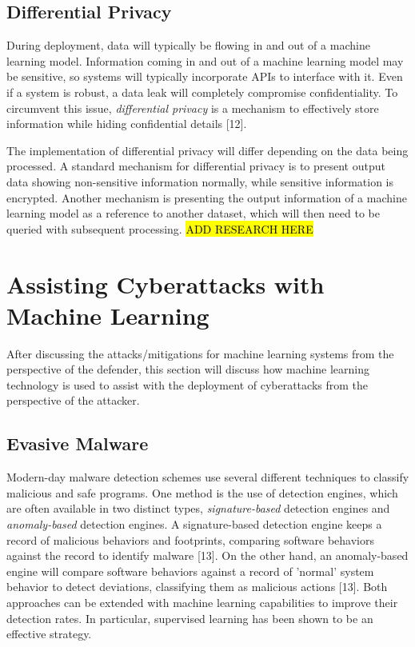 \documentclass[11pt,conference]{IEEEtran}
\begin{document}
\subsection{Differential Privacy}
During deployment, data will typically be flowing in and out of a machine
learning model. Information coming in and out of a machine learning model may be sensitive, so
systems will typically incorporate APIs to interface with it. Even if a system
is robust, a data leak will completely compromise confidentiality. To
circumvent this issue, \emph{differential privacy} is a mechanism to
effectively store
information while hiding confidential details [12].

The implementation of differential privacy will differ depending on the data
being processed. A standard mechanism for differential privacy is to present
output data showing non-sensitive information normally, while sensitive
information is encrypted. Another mechanism is presenting the output
information of a machine learning model as a reference to another dataset, which
will then need to be queried with subsequent processing.
\hl{ADD RESEARCH HERE}

\section{Assisting Cyberattacks with Machine Learning}
After discussing the attacks/mitigations for machine learning systems
from the perspective of the defender, this section will discuss how machine
learning technology is used to assist with the deployment of cyberattacks from
the perspective of the attacker.

\subsection{Evasive Malware}
Modern-day malware detection schemes use several different techniques to
classify malicious and safe programs. One method is the use of detection
engines, which are often available in two distinct types,
\emph{signature-based} detection engines and \emph{anomaly-based} detection
engines. A signature-based detection engine keeps a record of malicious
behaviors and footprints, comparing software behaviors against the record to
identify malware [13]. On the other hand, an anomaly-based engine will
compare software behaviors against a record of 'normal' system behavior to
detect deviations, classifying them as malicious actions [13]. Both approaches can be extended with machine learning
capabilities to improve their detection rates. In particular, supervised
learning has been shown to be an effective strategy.
\end{document}
